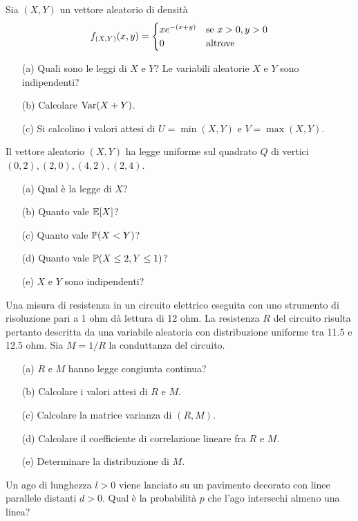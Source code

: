 \Esercizio{}
Sia $(X,Y)$ un vettore aleatorio di densità
\[
f_{(X,Y)}(x,y)=\begin{cases}
xe^{-(x+y)} &\text{se }x>0,y>0 \\
0 &\text{altrove}
\end{cases}
\]
\begin{enumerate}
\item [(a)] Quali sono le leggi di $X$ e $Y$? Le variabili aleatorie $X$ e $Y$ sono indipendenti?
\item [(b)] Calcolare $\operatorname{Var}(X+Y)$.
\item [(c)] Si calcolino i valori attesi di $U=\min(X,Y)$ e $V=\max(X,Y)$.
\end{enumerate}

\Esercizio{}
Il vettore aleatorio $(X,Y)$ ha legge uniforme sul quadrato $Q$ di vertici $(0,2),(2,0),(4,2),(2,4)$.
\begin{enumerate}
\item [(a)] Qual è la legge di $X$?
\item [(b)] Quanto vale $\mathbb{E}[X]$?
\item [(c)] Quanto vale $\mathbb{P}(X<Y)$?
\item [(d)] Quanto vale $\mathbb{P}(X\leq 2,Y\leq 1)$?
\item [(e)] $X$ e $Y$ sono indipendenti?
\end{enumerate}

\Esercizio{}
Una misura di resistenza in un circuito elettrico eseguita con uno strumento di risoluzione pari a 1 ohm dà lettura di 12 ohm. La resistenza $R$ del circuito risulta pertanto descritta da una variabile aleatoria con distribuzione uniforme tra 11.5 e 12.5 ohm. Sia $M=1/R$ la conduttanza del circuito. 
\begin{enumerate}
\item [(a)] $R$ e $M$ hanno legge congiunta continua?
\item [(b)] Calcolare i valori attesi di $R$ e $M$.
\item [(c)] Calcolare la matrice varianza di $(R,M)$.
\item [(d)] Calcolare il coefficiente di correlazione lineare fra $R$ e $M$.
\item [(e)] Determinare la distribuzione di $M$.
\end{enumerate}

Un ago di lunghezza $l>0$ viene lanciato su un pavimento decorato con linee parallele distanti $d>0$. Qual è la probabilità $p$ che l'ago intersechi almeno una linea?

